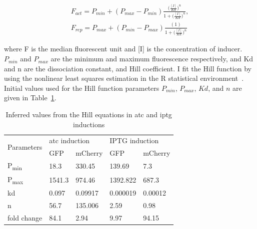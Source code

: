 \begin{align}
 	F_{act} = P_{min} + (P_{max} - P_{min})\frac{\Big(\frac{[I]}{Kd}\Big)^n}{1+\Big(\frac{[I]}{Kd}\Big)^n},\\
 	F_{rep} = P_{max} + (P_{min} - P_{max})\frac{(1)}{1+\Big(\frac{[I]}{Kd}\Big)^n}
\end{align}
 
\noindent where F is the median fluorescent unit and [I] is the concentration of inducer. $P_{min}$ and $P_{max}$ are the minimum and maximum fluorescence respectively, and Kd and n are the dissociation constant, and Hill coefficient. I fit the Hill function by using the nonlinear least squares estimation in the R statistical environment~\autocite{R:2008}. Initial values used for the Hill function parameters $P_{min}$, $P_{max}$, $Kd$, and $n$ are given in Table~\ref{tab:hill_initial}.




\begin{table}[tb]
\centering
\caption{Inferred values from the Hill equations in \acrshort{atc} and \acrshort{iptg} inductions}
\label{tab:hill_initial}
\begin{tabular}{@{}lllll@{}}
\toprule
\multirow{2}{*}{Parameters} & \multicolumn{2}{l}{\acrshort{atc} induction} & \multicolumn{2}{l}{IPTG induction} \\ \cmidrule(l){2-5} 
 & GFP & mCherry & GFP & mCherry \\ \midrule
P\textsubscript{min} & 18.3 & 330.45 & 139.69 & 7.3 \\
P\textsubscript{max} & 1541.3 & 974.46 & 1392.822 & 687.3 \\
kd & 0.097 & 0.09917 & 0.000019 & 0.00012\\
n & 56.7 & 135.006 & 2.59 & 0.98\\ 
fold change & 84.1 & 2.94 & 9.97 & 94.15 \\ \bottomrule
\end{tabular}
\end{table}

